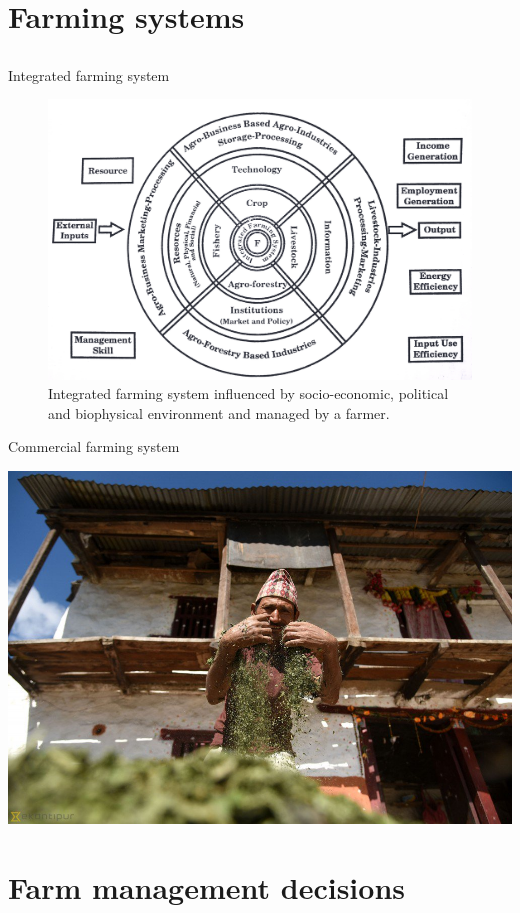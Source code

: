 \documentclass[12pt,ignorenonframetext,aspectratio=169]{beamer}
\begin{document}
\hypertarget{farming-systems}{%
\section{Farming systems}\label{farming-systems}}

\hypertarget{section-5}{%
\subsection{}\label{section-5}}

\begin{frame}{Integrated farming system}
\protect\hypertarget{integrated-farming-system}{}

\begin{figure}
\includegraphics[width=0.5\linewidth]{./figs/integrated_fs} \caption{Integrated farming system influenced by socio-economic, political and biophysical environment and managed by a farmer.}\label{fig:integrated-fs}
\end{figure}

\end{frame}

\begin{frame}{Commercial farming system}
\protect\hypertarget{commercial-farming-system}{}

\begin{center}\includegraphics[width=0.45\linewidth]{./figs/crop_value_addition} \end{center}

\end{frame}

\hypertarget{farm-management-decisions}{%
\section{Farm management decisions}\label{farm-management-decisions}}
\end{document}
